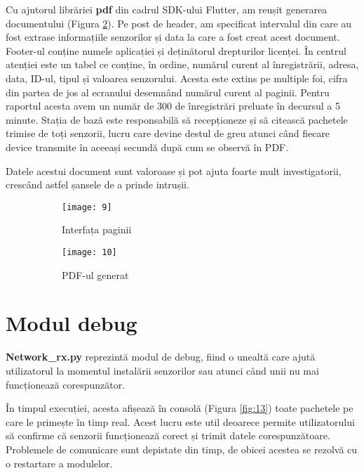 Cu ajutorul librăriei \textbf{pdf} din cadrul SDK-ului Flutter, am reușit generarea documentului (Figura \ref{fig:10}). Pe post de header, am specificat intervalul din care au fost extrase informațiile senzorilor și data la care a fost creat acest document. Footer-ul conține numele aplicației și deținătorul drepturilor licenței. În centrul atenției este un tabel ce conține, în ordine, numărul curent al înregistrării, adresa, data, ID-ul, tipul și valoarea senzorului. Acesta este extins pe multiple foi, cifra din partea de jos al ecranului desemnând numărul curent al paginii. Pentru raportul acesta avem un număr de 300 de înregistrări preluate în decursul a 5 minute. Stația de bază este responsabilă să recepționeze și să citească pachetele trimise de toți senzorii, lucru care devine destul de greu atunci când fiecare device transmite în aceeași secundă după cum se observă în PDF.

Datele acestui document sunt valoroase și pot ajuta foarte mult investigatorii, crescând astfel șansele de a prinde intrușii.

\begin{figure}[h]
	\centering
	\begin{subfigure}{0.43\textwidth}
		\centering
		\texttt{[image: 9]}
		\caption{Interfața paginii}
		\label{fig:9}
	\end{subfigure}
	\hfill
	\begin{subfigure}{0.43\textwidth}
		\centering
		\texttt{[image: 10]}
		\caption{PDF-ul generat}
		\label{fig:10}
	\end{subfigure}
	\caption{}
	\label{fig:all4}
\end{figure}
\break


\section{Modul debug}

\textbf{Network\_rx.py} reprezintă modul de debug, fiind o unealtă care ajută utilizatorul la momentul instalării senzorilor sau atunci când unii nu mai funcționează corespunzător.

În timpul execuției, acesta afișează în consolă (Figura \ref{fig:13}) toate pachetele pe care le primește în timp real. Acest lucru este util deoarece permite utilizatorului să confirme că senzorii funcționează corect și trimit datele corespunzătoare. Problemele de comunicare sunt depistate din timp, de obicei acestea se rezolvă cu o restartare a modulelor.

